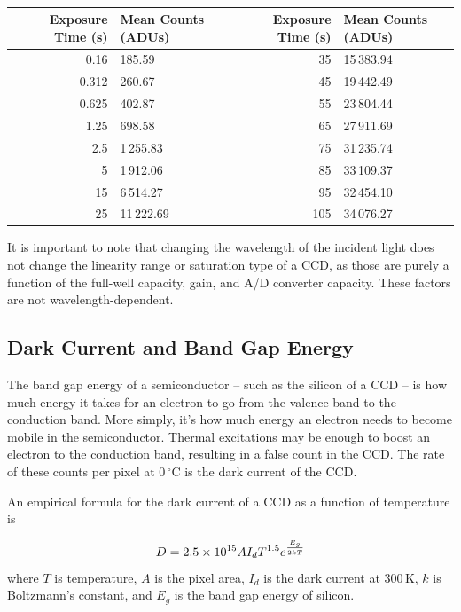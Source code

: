 \documentclass[12pt,letterpaper]{report}
\begin{document}
\begin{table}[H]
	\centering
	\begin{tabular}{rl|rl}
		Exposure Time (s) & Mean Counts (ADUs) & Exposure Time (s) & Mean Counts (ADUs) \\ \hline
		0.16 & 185.59 & 35 & 15$\,$383.94 \rule{0pt}{14pt} \\
		0.312 & 260.67 & 45 & 19$\,$442.49 \rule{0pt}{14pt} \\
		0.625 & 402.87 & 55 & 23$\,$804.44 \rule{0pt}{14pt} \\
		1.25 & 698.58 & 65 & 27$\,$911.69 \rule{0pt}{14pt} \\
		2.5 & 1$\,$255.83 & 75 & 31$\,$235.74 \rule{0pt}{14pt} \\
		5 & 1$\,$912.06 & 85 & 33$\,$109.37 \rule{0pt}{14pt} \\
		15 & 6$\,$514.27 & 95 & 32$\,$454.10 \rule{0pt}{14pt} \\
		25 & 11$\,$222.69 & 105 & 34$\,$076.27 \rule{0pt}{14pt}
	\end{tabular}
	\caption{}
	\label{tab:Linearity}
\end{table}

It is important to note that changing the wavelength of the incident light does not change the linearity range or saturation type of a CCD, as those are purely a function of the full-well capacity, gain, and A/D converter capacity. These factors are not wavelength-dependent.

\subsection*{Dark Current and Band Gap Energy}

The band gap energy of a semiconductor -- such as the silicon of a CCD -- is how much energy it takes for an electron to go from the valence band to the conduction band. More simply, it's how much energy an electron needs to become mobile in the semiconductor. Thermal excitations may be enough to boost an electron to the conduction band, resulting in a false count in the CCD. The rate of these counts per pixel at 0$\,^{\circ}$C is the dark current of the CCD.

An empirical formula for the dark current of a CCD as a function of temperature is

\begin{equation}
D = 2.5\times10^{15} A I_d T^{1.5} e^\frac{E_g}{2 k T \rule{0pt}{5pt}}
\label{eq:DarkCurrent}
\end{equation}
where $T$ is temperature, $A$ is the pixel area, $I_d$ is the dark current at 300$\,$K, $k$ is Boltzmann's constant, and $E_g$ is the band gap energy of silicon.
\end{document}
